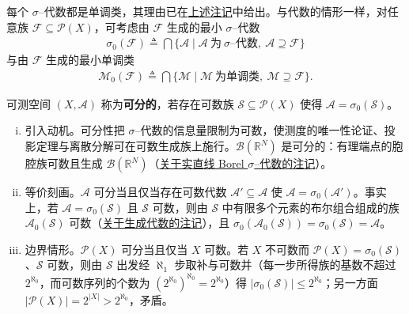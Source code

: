 \documentclass[../../main.tex]{subfiles}%
\begin{document}
每个 $\sigma$--代数都是单调类，其理由已在\hyperref[remark:ch01-单调类]{上述注记}中给出。与代数的情形一样，对任意族 $\mathcal{F}\subseteq\mathcal{P}(X)$，可考虑由 $\mathcal{F}$ 生成的最小 $\sigma$--代数
\begin{align*}
\sigma_0(\mathcal{F})\triangleq\bigcap\{\mathcal{A}\mid\mathcal{A}\ \text{为}\ \sigma\text{--代数},\ \mathcal{A}\supseteq\mathcal{F}\}
\end{align*}
与由 $\mathcal{F}$ 生成的最小单调类
\begin{align*}
\mathcal{M}_0(\mathcal{F})\triangleq\bigcap\{\mathcal{M}\mid\mathcal{M}\ \text{为单调类},\ \mathcal{M}\supseteq\mathcal{F}\}.
\end{align*}

\begin{definition}\label{definition:ch01-可分可测空间}\label{definition:ch01-可分空间}
可测空间 $(X,\mathcal{A})$ 称为\textbf{可分的}，若存在可数族 $\mathcal{S}\subseteq\mathcal{P}(X)$ 使得 $\mathcal{A}=\sigma_0(\mathcal{S})$。
\end{definition}

\begin{remark}\label{remark:ch01-可分}
\begin{enumerate}[(i)]
\item 引入动机。可分性把 $\sigma$--代数的信息量限制为可数，使测度的唯一性论证、投影定理与离散分解可在可数生成族上施行。$\mathcal{B}(\mathbb{R}^N)$ 是可分的：有理端点的胞腔族可数且生成 $\mathcal{B}(\mathbb{R}^N)$（\hyperref[remark:ch01-实直线Borel]{关于实直线 Borel $\sigma$--代数的注记}）。
\item 等价刻画。$\mathcal{A}$ 可分当且仅当存在可数代数 $\mathcal{A}'\subseteq\mathcal{A}$ 使 $\mathcal{A}=\sigma_0(\mathcal{A}')$。事实上，若 $\mathcal{A}=\sigma_0(\mathcal{S})$ 且 $\mathcal{S}$ 可数，则由 $\mathcal{S}$ 中有限多个元素的布尔组合组成的族 $\mathcal{A}_0(\mathcal{S})$ 可数（\hyperref[remark:ch01-生成代数]{关于生成代数的注记}），且 $\sigma_0(\mathcal{A}_0(\mathcal{S}))=\sigma_0(\mathcal{S})=\mathcal{A}$。
\item 边界情形。$\mathcal{P}(X)$ 可分当且仅当 $X$ 可数。若 $X$ 不可数而 $\mathcal{P}(X)=\sigma_0(\mathcal{S})$、$\mathcal{S}$ 可数，则由 $\mathcal{S}$ 出发经 $\aleph_1$ 步取补与可数并（每一步所得族的基数不超过 $2^{\aleph_0}$，而可数序列的个数为 $(2^{\aleph_0})^{\aleph_0}=2^{\aleph_0}$）得 $\lvert\sigma_0(\mathcal{S})\rvert\leqslant2^{\aleph_0}$；另一方面 $\lvert\mathcal{P}(X)\rvert=2^{\lvert X\rvert}>2^{\aleph_0}$，矛盾。
\end{enumerate}
\end{remark}
\end{document}
